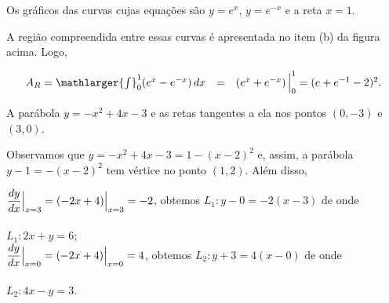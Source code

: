 \cleardoublepage\documentclass[../main.tex]{subfiles}
\begin{document}
\begin{exeresol}
\begin{compactenum}[a)]
\item Os gráficos das curvas cujas equações são \(y=e^x\), \(y=e^{-x}\) e a reta \(x=1\).

\begin{solution}
A região compreendida entre essas curvas é apresentada no item (b) da figura acima. Logo,

\[ \begin{array}{rcl} A_R= \mathlarger{\int}^{1}_{0} (e^x - e^{-x})\,dx &=& \left(e^x + e^{-x}\right)\Big{|}^{1}_{0} = (e +e^{-1}-2)^2. \end{array} \]
\end{solution}
\item A parábola \(y=-x^2 +4x-3\) e as retas tangentes a ela nos pontos \((0,-3)\) e \((3,0)\).

\begin{solution}
Observamos que \(y=-x^2 +4x-3 =1-(x-2)^2\) e, assim, a parábola \(y-1=-(x-2)^2\) tem vértice no ponto \((1,2)\). Além disso,

\(\dfrac{dy}{dx}\Big{|}_{x=3}= (-2x+4)\Big{|}_{x=3} =-2\), obtemos \(L_1: y-0=-2(x-3)\) de onde\\\\ \(L_1: 2x+y=6\);\\

\(\dfrac{dy}{dx}\Big{|}_{x=0}= (-2x+4)\Big{|}_{x=0} =4\), obtemos \(L_2: y+3=4(x-0)\) de onde\\\\ \(L_2: 4x-y=3\).


\end{solution}
\end{compactenum}
\end{exeresol}
\end{document}
